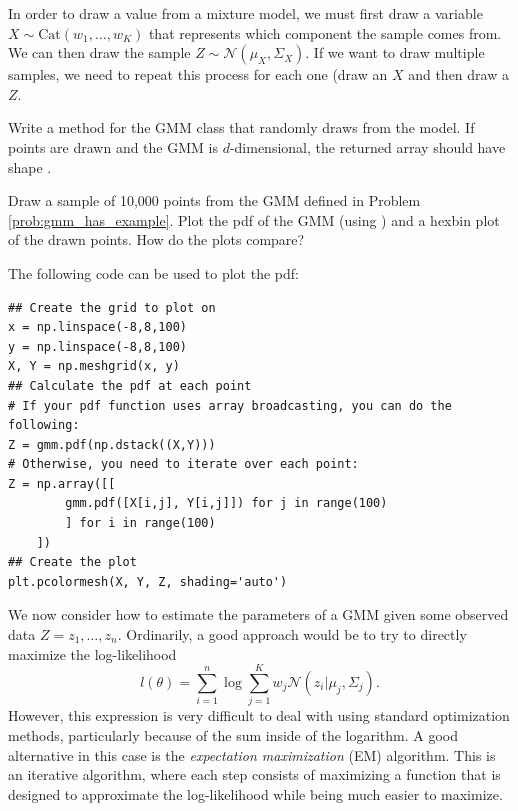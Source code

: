 In order to draw a value from a mixture model, we must first draw a variable \(X \sim \mathrm{Cat}(w_1,\ldots, w_K)\) that represents which component the sample comes from.
We can then draw the sample \(Z\sim \mathcal{N}(\mu_X, \Sigma_X)\).
If we want to draw multiple samples, we need to repeat this process for each one (draw an \(X\) and then draw a \(Z\).

\begin{problem}
Write a method  for the GMM class that randomly draws from the model.
If  points are drawn and the GMM is \(d\)-dimensional, the returned array should have shape .

Draw a sample of 10,000 points from the GMM defined in Problem \ref{prob:gmm_has_example}.
Plot the pdf of the GMM (using ) and a hexbin plot of the drawn points.
How do the plots compare?

The following code can be used to plot the pdf:
\begin{lstlisting}
## Create the grid to plot on
x = np.linspace(-8,8,100)
y = np.linspace(-8,8,100)
X, Y = np.meshgrid(x, y)
## Calculate the pdf at each point
# If your pdf function uses array broadcasting, you can do the following:
Z = gmm.pdf(np.dstack((X,Y)))
# Otherwise, you need to iterate over each point:
Z = np.array([[
        gmm.pdf([X[i,j], Y[i,j]]) for j in range(100)
        ] for i in range(100)
    ])
## Create the plot
plt.pcolormesh(X, Y, Z, shading='auto')
\end{lstlisting}
\label{prob:gmm_plot_example}
\end{problem}

We now consider how to estimate the parameters of a GMM given some observed data \(Z = z_1,\ldots, z_n\).
Ordinarily, a good approach would be to try to directly maximize the log-likelihood
\[
l(\theta)=\sum_{i=1}^n\log\sum_{j=1}^Kw_{j} \mathcal{N}(z_i | \mu_{j}, \Sigma_{j}).
\]
However, this expression is very difficult to deal with using standard optimization methods, particularly because of the sum inside of the logarithm.
A good alternative in this case is the \emph{expectation maximization} (EM) algorithm.
This is an iterative algorithm, where each step consists of maximizing a function that is designed to approximate the log-likelihood while being much easier to maximize.

